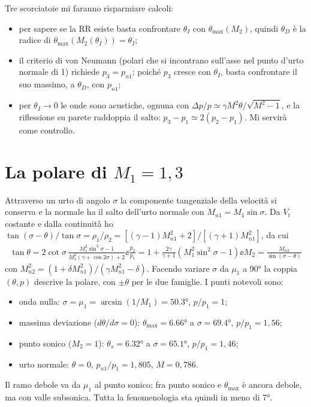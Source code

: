 Tre scorciatoie mi faranno risparmiare calcoli:
\begin{itemize}
\item per sapere se la RR esiste basta confrontare $\theta_I$ con $\theta_{\max}(M_2)$, quindi $\theta_D$ è la radice
  di $\theta_{\max}(M_2(\theta_I))=\theta_I$;
\item il criterio di von Neumann (polari che si incontrano sull'asse nel punto d'urto normale di 1) richiede
  $p_3=p_{n1}$; poiché $p_3$ cresce con $\theta_I$, basta confrontare il suo massimo, a $\theta_D$, con $p_{n1}$;
\item per $\theta_I\to0$ le onde sono acustiche, ognuna con $\Delta p/p\simeq\gamma M^2\theta/\sqrt{M^2-1}$, e la
  riflessione su parete raddoppia il salto: $p_3-p_1\simeq2(p_2-p_1)$. Mi servirà come controllo.
\end{itemize}

\section*{La polare di $M_1=1{,}3$}
Attraverso un urto di angolo $\sigma$ la componente tangenziale della velocità si conserva e la normale ha il salto
dell'urto normale con $M_{n1}=M_1\sin\sigma$. Da $V_t$ costante e dalla continuità ho
$\tan(\sigma-\theta)/\tan\sigma=\rho_1/\rho_2=[(\gamma-1)M_{n1}^2+2]/[(\gamma+1)M_{n1}^2]$, da cui
\begin{gather*}
\tan\theta=2\cot\sigma\,\frac{M_1^2\sin^2\sigma-1}{M_1^2(\gamma+\cos2\sigma)+2}\ee
\frac{p_2}{p_1}=1+\frac{2\gamma}{\gamma+1}\left(M_1^2\sin^2\sigma-1\right)\ee
M_2=\frac{M_{n2}}{\sin(\sigma-\theta)}
\end{gather*}
con $M_{n2}^2=(1+\delta M_{n1}^2)/(\gamma M_{n1}^2-\delta)$. Facendo variare $\sigma$ da $\mu_1$ a \ang{90} la coppia
$(\theta,p)$ descrive la polare, con $\pm\theta$ per le due famiglie. I punti notevoli sono:
\begin{itemize}
\item onda nulla: $\sigma=\mu_1=\arcsin(1/M_1)=\ang{50.3}$, $p/p_1=1$;
\item massima deviazione ($d\theta/d\sigma=0$): $\theta_{\max}=\ang{6.66}$ a $\sigma=\ang{69.4}$, $p/p_1=1{,}56$;
\item punto sonico ($M_2=1$): $\theta_s=\ang{6.32}$ a $\sigma=\ang{65.1}$, $p/p_1=1{,}46$;
\item urto normale: $\theta=0$, $p_{n1}/p_1=1{,}805$, $M=0{,}786$.
\end{itemize}
Il ramo debole va da $\mu_1$ al punto sonico; fra punto sonico e $\theta_{\max}$ è ancora debole, ma con valle
subsonica. Tutta la fenomenologia sta quindi in meno di \ang{7}.

